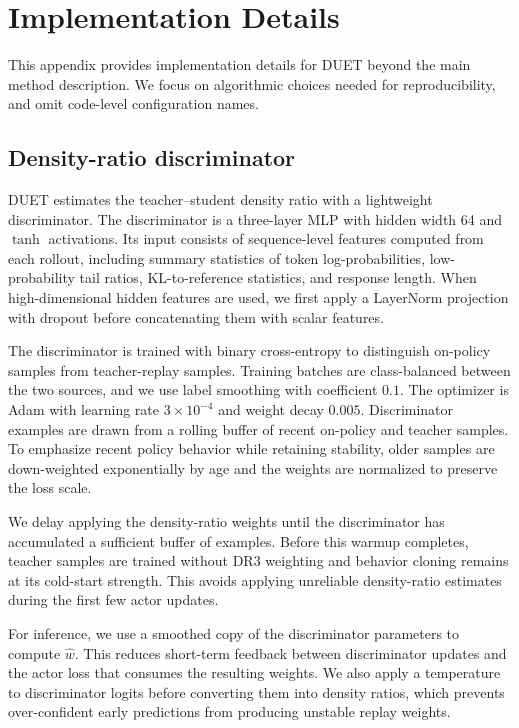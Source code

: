 
\section{Implementation Details}
\label{app:impl}

This appendix provides implementation details for DUET beyond the main method description.
We focus on algorithmic choices needed for reproducibility, and omit code-level configuration names.

\subsection{Density-ratio discriminator}
\label{app:disc}

DUET estimates the teacher--student density ratio with a lightweight discriminator.
The discriminator is a three-layer MLP with hidden width 64 and $\tanh$ activations.
Its input consists of sequence-level features computed from each rollout, including summary statistics of token log-probabilities, low-probability tail ratios, KL-to-reference statistics, and response length.
When high-dimensional hidden features are used, we first apply a LayerNorm projection with dropout before concatenating them with scalar features.

The discriminator is trained with binary cross-entropy to distinguish on-policy samples from teacher-replay samples.
Training batches are class-balanced between the two sources, and we use label smoothing with coefficient $0.1$.
The optimizer is Adam with learning rate $3\times 10^{-4}$ and weight decay $0.005$.
Discriminator examples are drawn from a rolling buffer of recent on-policy and teacher samples.
To emphasize recent policy behavior while retaining stability, older samples are down-weighted exponentially by age and the weights are normalized to preserve the loss scale.

We delay applying the density-ratio weights until the discriminator has accumulated a sufficient buffer of examples.
Before this warmup completes, teacher samples are trained without DR3 weighting and behavior cloning remains at its cold-start strength.
This avoids applying unreliable density-ratio estimates during the first few actor updates.

For inference, we use a smoothed copy of the discriminator parameters to compute $\hat w$.
This reduces short-term feedback between discriminator updates and the actor loss that consumes the resulting weights.
We also apply a temperature to discriminator logits before converting them into density ratios, which prevents over-confident early predictions from producing unstable replay weights.

